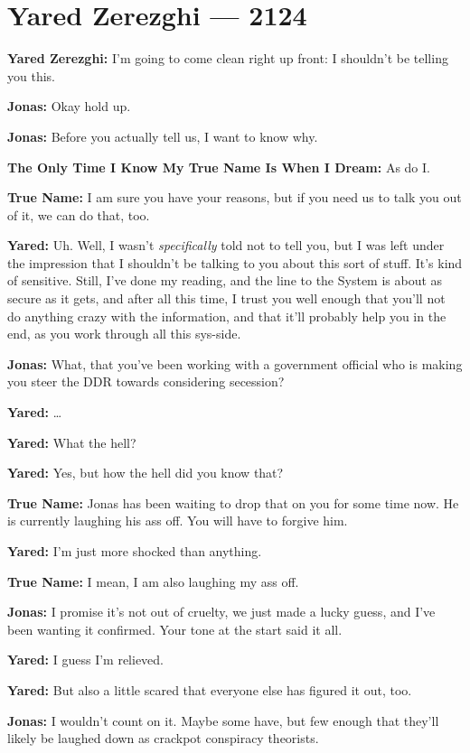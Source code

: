 \hypertarget{yared-zerezghi-2124}{%
\chapter{Yared Zerezghi — 2124}\label{yared-zerezghi-2124}}

\textbf{Yared Zerezghi:} I'm going to come clean right up front: I shouldn't be telling you this.

\textbf{Jonas:} Okay hold up.

\textbf{Jonas:} Before you actually tell us, I want to know why.

\textbf{The Only Time I Know My True Name Is When I Dream:} As do I.

\textbf{True Name:} I am sure you have your reasons, but if you need us to talk you out of it, we can do that, too.

\textbf{Yared:} Uh. Well, I wasn't \emph{specifically} told not to tell you, but I was left under the impression that I shouldn't be talking to you about this sort of stuff. It's kind of sensitive. Still, I've done my reading, and the line to the System is about as secure as it gets, and after all this time, I trust you well enough that you'll not do anything crazy with the information, and that it'll probably help you in the end, as you work through all this sys-side.

\textbf{Jonas:} What, that you've been working with a government official who is making you steer the DDR towards considering secession?

\textbf{Yared:} \ldots{}

\textbf{Yared:} What the hell?

\textbf{Yared:} Yes, but how the hell did you know that?

\textbf{True Name:} Jonas has been waiting to drop that on you for some time now. He is currently laughing his ass off. You will have to forgive him.

\textbf{Yared:} I'm just more shocked than anything.

\textbf{True Name:} I mean, I am also laughing my ass off.

\textbf{Jonas:} I promise it's not out of cruelty, we just made a lucky guess, and I've been wanting it confirmed. Your tone at the start said it all.

\textbf{Yared:} I guess I'm relieved.

\textbf{Yared:} But also a little scared that everyone else has figured it out, too.

\textbf{Jonas:} I wouldn't count on it. Maybe some have, but few enough that they'll likely be laughed down as crackpot conspiracy theorists.

